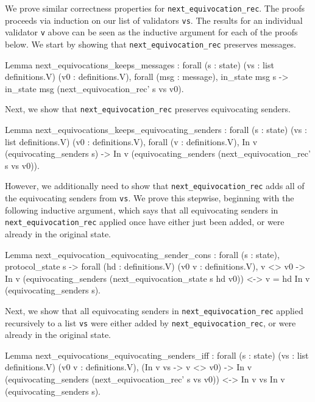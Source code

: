 \documentclass[runningheads]{llncs}
\begin{document}
We prove similar correctness properties for \verb|next_equivocation_rec|. The proofs proceeds via induction on our list of validators \verb|vs|. The results for an individual validator \verb|v| above can be seen as the inductive argument for each of the proofs below. 
We start by showing that \verb|next_equivocation_rec| preserves messages. 
\begin{coq}
Lemma next_equivocations_keeps_messages :
	forall (s : state) (vs : list definitions.V) 
				 (v0 : definitions.V),
	forall (msg : message),
	in_state msg s ->
	in_state msg (next_equivocation_rec' s vs v0). 
\end{coq}
Next, we show that \verb|next_equivocation_rec| preserves equivocating senders. 
\begin{coq}
	Lemma next_equivocations_keeps_equivocating_senders :
	forall (s : state) (vs : list definitions.V) 
			 	 (v0 : definitions.V),
	forall (v : definitions.V),
	In v (equivocating_senders s) ->
	In v (equivocating_senders (next_equivocation_rec' s vs v0)).
\end{coq}
However, we additionally need to show that \verb|next_equivocation_rec| adds all of the equivocating senders from \verb|vs|. We prove this stepwise, beginning with the following inductive argument, which says that all equivocating senders in \verb|next_equivocation_rec| applied once have either just been added, or were already in the original state. 
\begin{coq}
Lemma next_equivocation_equivocating_sender_cons :
	forall (s : state),
	protocol_state s ->
	forall (hd : definitions.V) (v0 v : definitions.V),
	v <> v0 -> 
	In v (equivocating_senders (next_equivocation_state s hd v0)) 
	<->
	v = hd \/ In v (equivocating_senders s).
\end{coq}
Next, we show that all equivocating senders in \verb|next_equivocation_rec| applied recursively to a list \verb|vs| were either added by \verb|next_equivocation_rec|, or were already in the original state. 
\begin{coq}
Lemma next_equivocations_equivocating_senders_iff :
	forall (s : state) (vs : list definitions.V) 
				 (v0 v : definitions.V),
	(In v vs -> v <> v0) ->
	In v (equivocating_senders (next_equivocation_rec' s vs v0)) 
	<->
	In v vs \/ In v (equivocating_senders s). 
\end{coq}
\end{document}
